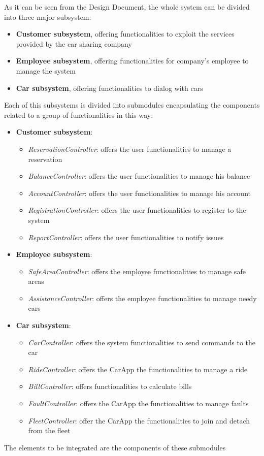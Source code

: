 As it can be seen from the Design Document, the whole system can be divided into three major subsystem:
\begin{itemize}
\item \textbf{Customer subsystem}, offering functionalities to exploit the services provided by the car sharing company

\item \textbf{Employee subsystem}, offering functionalities for company's employee to manage the system

\item \textbf{Car subsystem}, offering functionalities to dialog with cars
\end{itemize}

Each of this subsystems is divided into submodules encapsulating the components related to a group of functionalities in this way:
\begin{itemize}
\item \textbf{Customer subsystem}:
\begin{itemize}
\item \textit{ReservationController}: offers the user functionalities to manage a reservation
\item \textit{BalanceController}: offers the user functionalities to manage his balance
\item \textit{AccountController}: offers the user functionalities to manage his account
\item \textit{RegistrationController}: offers the user functionalities to register to the system
\item \textit{ReportController}: offers the user functionalities to notify issues
\end{itemize}
\item \textbf{Employee subsystem}:
\begin{itemize}
\item \textit{SafeAreaController}: offers the employee functionalities to manage safe areas
\item \textit{AssistanceController}: offers the employee functionalities to manage needy cars
\end{itemize}
\item \textbf{Car subsystem}:
\begin{itemize}
\item \textit{CarController}: offers the system functionalities to send commands to the car
\item \textit{RideController}: offers the CarApp the functionalities to manage a ride
\item \textit{BillController}: offers functionalities to calculate bills
\item \textit{FaultController}: offers the CarApp the functionalities to manage faults
\item \textit{FleetController}: offer the CarApp the functionalities to join and detach from the fleet
\end{itemize}
\end{itemize}


The elements to be integrated are the components of these submodules